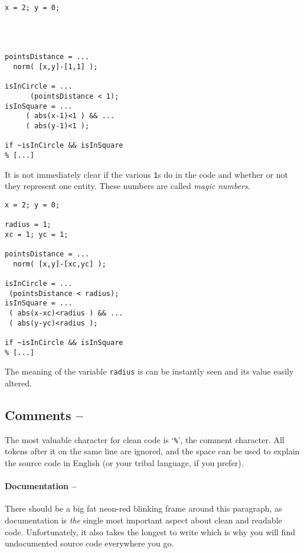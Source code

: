 \hfill
\begin{minipage}[t]{.45\textwidth}\label{example:magic-numbers}
\begin{lstlisting}[framerule=2pt,rulecolor=\color{badred}]
x = 2; y = 0;




pointsDistance = ...
  norm( [x,y]-[1,1] );

isInCircle = ...
      (pointsDistance < 1);
isInSquare = ...
     ( abs(x-1)<1 ) && ...
     ( abs(y-1)<1 );

if ~isInCircle && isInSquare
% [...]
\end{lstlisting}
It is not immediately clear if the various \lstinline!1!s do in the code and
whether or not they represent one entity. These numbers are called \emph{magic
numbers}.
\end{minipage}
\hfill
\begin{minipage}[t]{.45\textwidth}
\begin{lstlisting}[framerule=2pt,rulecolor=\color{goodgreen}]
x = 2; y = 0;

radius = 1;
xc = 1; yc = 1;

pointsDistance = ...
  norm( [x,y]-[xc,yc] );

isInCircle = ...
 (pointsDistance < radius);
isInSquare = ...
 ( abs(x-xc)<radius ) && ...
 ( abs(y-yc)<radius );

if ~isInCircle && isInSquare
% [...]
\end{lstlisting}
The meaning of the variable \lstinline!radius! is can be instantly seen and its
value easily altered.
\end{minipage}
\hfill


\subsection{Comments  -- \cleansymbol\cleansymbol\cleansymbol\cleansymbol\cleansymbol}

The most valuable character for clean \matlab{} code is `\lstinline!%!',
the comment character. All tokens after it on the same line are ignored, and
the space can be used to explain the source code in English (or your tribal
language, if you prefer).

\paragraph{Documentation -- \cleansymbol\cleansymbol\cleansymbol\cleansymbol\cleansymbol}
There should be a big fat neon-red blinking frame around this paragraph, as
documentation is \emph{the} single most important aspect about clean and
readable code. Unfortunately, it also takes the longest to write which is why
you will find undocumented source code everywhere you go.

